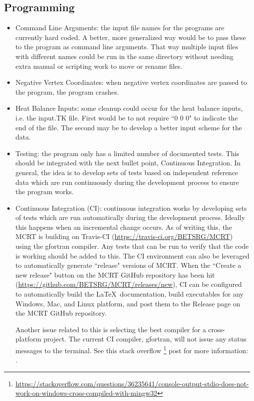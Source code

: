 \documentclass{article}
\begin{document}
\subsection{Programming}

\begin{itemize}
    \item Command Line Arguments: the input file names for the programs are currently hard coded. A better, more generalized way would be to pass these to the program as command line arguments. That way multiple input files with different names could be run in the same directory without needing extra manual or scripting work to move or rename files.

    \item Negative Vertex Coordinates: when negative vertex coordinates are passed to the program, the program crashes.

    \item Heat Balance Inputs: some cleanup could occur for the heat balance inputs, i.e. the input.TK file. First would be to not require ``0 0 0" to indicate the end of the file. The second may be to develop a better input scheme for the data.

    \item Testing: the program only has a limited number of documented tests. This should be integrated with the next bullet point, Continuous Integration. In general, the idea is to develop sets of tests based on independent reference data which are run continuously during the development process to ensure the program works.

    \item Continuous Integration (CI): continuous integration works by developing sets of tests which are run automatically during the development process. Ideally this happens when an incremental change occurs. As of writing this, the MCRT is building on Travis-CI (\url{https://travis-ci.org/BETSRG/MCRT}) using the gfortran compiler. Any tests that can be run to verify that the code is working should be added to this. The CI environment can also be leveraged to automatically generate ``release" versions of MCRT. When the ``Create a new release" button on the MCRT GitHub repository has been hit (\url{https://github.com/BETSRG/MCRT/releases/new}), CI can be configured to automatically build the \LaTeX ~documentation, build executables for any Windows, Mac, and Linux platform, and post them to the Release page on the MCRT GitHub repository.
    
    Another issue related to this is selecting the best compiler for a cross-platform project. The current CI compiler, gfortran, will not issue any status messages to the terminal. See this stack overflow \footnote{\url{https://stackoverflow.com/questions/36235641/console-output-stdio-does-not-work-on-windows-cross-compiled-with-mingw32}} post for more information: .


\end{itemize}
\end{document}
